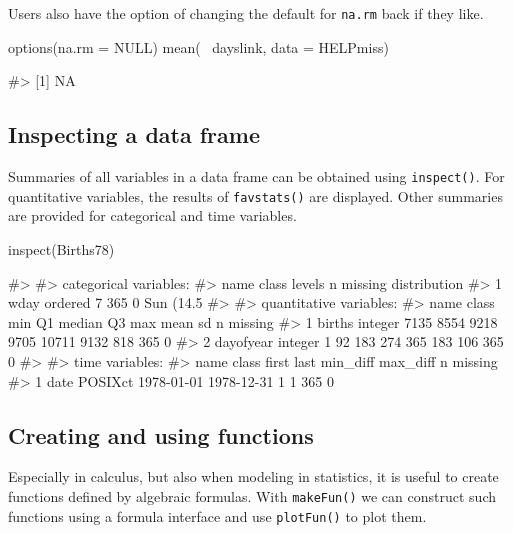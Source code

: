 \noindent
Users also have the option of changing the default for \texttt{na.rm}
back if they like.

\begin{Schunk}
\begin{Sinput}
options(na.rm = NULL)
mean(~ dayslink, data = HELPmiss)
\end{Sinput}
\begin{Soutput}
#> [1] NA
\end{Soutput}
\end{Schunk}

\subsection{Inspecting a data frame}\label{inspecting-a-data-frame}

Summaries of all variables in a data frame can be obtained using
\texttt{inspect()}. For quantitative variables, the results of
\texttt{favstats()} are displayed. Other summaries are provided for
categorical and time variables.

\begin{Schunk}
\begin{Sinput}
inspect(Births78)
\end{Sinput}
\begin{Soutput}
#> 
#> categorical variables:  
#>   name   class levels   n missing                                  distribution
#> 1 wday ordered      7 365       0 Sun (14.5%
#> 
#> quantitative variables:  
#>        name   class  min   Q1 median   Q3   max mean  sd   n missing
#> 1    births integer 7135 8554   9218 9705 10711 9132 818 365       0
#> 2 dayofyear integer    1   92    183  274   365  183 106 365       0
#> 
#> time variables:  
#>   name   class      first       last min_diff max_diff   n missing
#> 1 date POSIXct 1978-01-01 1978-12-31        1        1 365       0
\end{Soutput}
\end{Schunk}

\subsection{Creating and using
functions}\label{creating-and-using-functions}

Especially in calculus, but also when modeling in statistics, it is
useful to create functions defined by algebraic formulas. With
\texttt{makeFun()} we can construct such functions using a formula
interface and use \texttt{plotFun()} to plot them.

